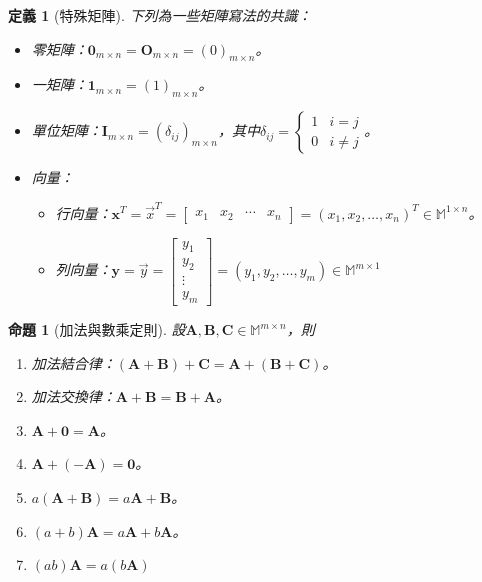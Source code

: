 \documentclass[12pt]{article}
\newtheorem{definition}{定義}
\newtheorem*{proposition}{命題}
\begin{document}
    \begin{definition}[特殊矩陣]
        下列為一些矩陣寫法的共識：\begin{itemize}
            \item 零矩陣：$\mathbf{0}_{m\times n}=\mathbf{O}_{m\times n}=(0)_{m\times n}$。
            \item 一矩陣：$\mathbf{1}_{m\times n}=(1)_{m\times n}$。
            \item 單位矩陣：$\mathbf{I}_{m\times n}=(\delta_{ij})_{m\times n}$，其中$\delta_{ij}=\begin{cases}
                1 & i=j\\ 0 & i\neq j
            \end{cases}$。
            \item 向量：\begin{itemize}
                \item 行向量：$\mathbf{x}^T=\vec{x}^T=\begin{bmatrix}
                    x_1&x_2&\cdots&x_n
                \end{bmatrix}=(x_1,x_2,\dots,x_n)^T\in\mathbb{M}^{1\times n}$。
                \item 列向量：$\mathbf{y}=\vec{y}=\begin{bmatrix}
                    y_1\\y_2\\\vdots\\y_m
                \end{bmatrix}=(y_1,y_2,\dots,y_m)\in\mathbb{M}^{m\times 1}$
            \end{itemize}
        \end{itemize}
    \end{definition}

    \begin{proposition}[加法與數乘定則]
        設$\mathbf{A},\mathbf{B},\mathbf{C}\in\mathbb{M}^{m\times n}$，則\begin{enumerate}
            \item 加法結合律：$(\mathbf{A}+\mathbf{B})+\mathbf{C}=\mathbf{A}+(\mathbf{B}+\mathbf{C})$。
            \item 加法交換律：$\mathbf{A}+\mathbf{B}=\mathbf{B}+\mathbf{A}$。
            \item $\mathbf{A}+\mathbf{0}=\mathbf{A}$。
            \item $\mathbf{A}+(-\mathbf{A})=\mathbf{0}$。
            \item $a(\mathbf{A}+\mathbf{B})=a\mathbf{A}+\mathbf{B}$。
            \item $(a+b)\mathbf{A}=a\mathbf{A}+b\mathbf{A}$。
            \item $(ab)\mathbf{A}=a(b\mathbf{A})$
        \end{enumerate}
    \end{proposition}
\end{document}
